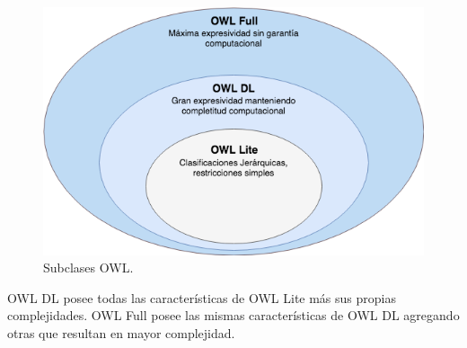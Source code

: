 \begin{figure}[h!]
    \centering
    \includegraphics[width=150mm]{figuras/Diagramas-OwlSubClasses.png}
    \caption{Subclases OWL. \cite{owllevels}}
    \label{img:subclases owl}
    \end{figure}

OWL DL posee todas las características de OWL Lite más sus propias complejidades. OWL Full posee las mismas características de OWL DL agregando otras que resultan en mayor complejidad.
